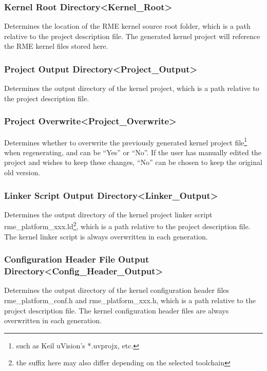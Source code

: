 \subsubsection{Kernel Root Directory<Kernel\_Root>{}}\label{subsubsec:5-3-12-12}

Determines the location of the RME kernel source root folder, which is a path relative to the project description file. The generated kernel project will reference the RME kernel files stored here.

\subsubsection{Project Output Directory<Project\_Output>{}}\label{subsubsec:5-3-12-13}

Determines the output directory of the kernel project, which is a path relative to the project description file.

\subsubsection{Project Overwrite<Project\_Overwrite>{}}\label{subsubsec:5-3-12-14}

Determines whether to overwrite the previously generated kernel project file\footnote{such as Keil uVision's *.uvprojx, etc.} when regenerating, and can be ``Yes'' or ``No''. If the user has manually edited the project and wishes to keep these changes, ``No'' can be chosen to keep the original old version.

\subsubsection{Linker Script Output Directory<Linker\_Output>{}}\label{subsubsec:5-3-12-15}

Determines the output directory of the kernel project linker script rme\_platform\_xxx.ld\footnote{the suffix here may also differ depending on the selected toolchain}, which is a path relative to the project description file. The kernel linker script is always overwritten in each generation.

\subsubsection{Configuration Header File Output Directory<Config\_Header\_Output>{}}\label{subsubsec:5-3-12-16}

Determines the output directory of the kernel configuration header files rme\_platform\_conf.h and rme\_platform\_xxx.h, which is a path relative to the project description file. The kernel configuration header files are always overwritten in each generation.

